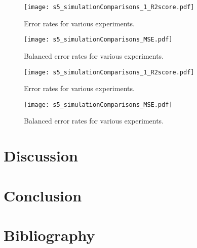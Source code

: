 \begin{figure}[h]
  \centering
  \begin{minipage}{0.45\textwidth}
    \centering
    \texttt{[image: s5\_simulationComparisons\_1\_R2score.pdf]}
    \caption{Error rates for various experiments.}
    \label{pl:s5_simulationComparisons_1_R2score}
  \end{minipage}
  \hfill
  \begin{minipage}{0.45\textwidth}
    \centering
    \texttt{[image: s5\_simulationComparisons\_MSE.pdf]}
    \caption{Balanced error rates for various experiments.}
    \label{pl:s5_simulationComparisons_MSE}
  \end{minipage}
\end{figure}

\begin{figure}[h]
  \centering
  \begin{minipage}{0.45\textwidth}
    \centering
    \texttt{[image: s5\_simulationComparisons\_1\_R2score.pdf]}
    \caption{Error rates for various experiments.}
    \label{pl:s5_simulationComparisons_1_R2score}
  \end{minipage}
  \hfill
  \begin{minipage}{0.45\textwidth}
    \centering
    \texttt{[image: s5\_simulationComparisons\_MSE.pdf]}
    \caption{Balanced error rates for various experiments.}
    \label{pl:s5_simulationComparisons_MSE}
  \end{minipage}
\end{figure}


\section{Discussion}

\newpage
\section{Conclusion}


\section*{Bibliography}
\nocite{*}
\printbibliography[heading=none, keyword={secondary}]




